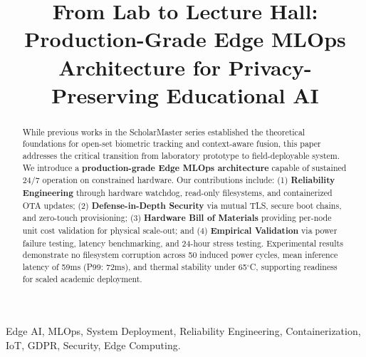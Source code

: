 \documentclass[conference]{IEEEtran}
\begin{document}
\title{From Lab to Lecture Hall: Production-Grade Edge MLOps Architecture for Privacy-Preserving Educational AI}

\author{
}

\maketitle

\begin{abstract}
While previous works in the ScholarMaster series established the theoretical foundations for open-set biometric tracking and context-aware fusion, this paper addresses the critical transition from laboratory prototype to field-deployable system. We introduce a \textbf{production-grade Edge MLOps architecture} capable of sustained 24/7 operation on constrained hardware. Our contributions include: (1) \textbf{Reliability Engineering} through hardware watchdog, read-only filesystems, and containerized OTA updates; (2) \textbf{Defense-in-Depth Security} via mutual TLS, secure boot chains, and zero-touch provisioning; (3) \textbf{Hardware Bill of Materials} providing per-node unit cost validation for physical scale-out; and (4) \textbf{Empirical Validation} via power failure testing, latency benchmarking, and 24-hour stress testing. Experimental results demonstrate no filesystem corruption across 50 induced power cycles, mean inference latency of 59ms (P99: 72ms), and thermal stability under 65$^{\circ}$C, supporting readiness for scaled academic deployment.
\end{abstract}

\begin{IEEEkeywords}
Edge AI, MLOps, System Deployment, Reliability Engineering, Containerization, IoT, GDPR, Security, Edge Computing.
\end{IEEEkeywords}

\end{document}
